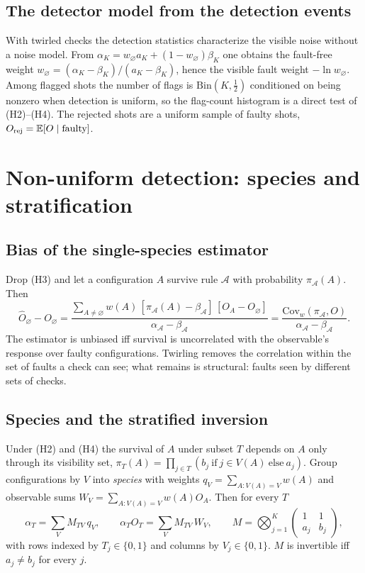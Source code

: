 \documentclass[11pt,a4paper]{article}
\theoremstyle{remark}
\newcommand{\Cov}{\mathrm{Cov}}
\newcommand{\Bin}{\mathrm{Bin}}
\newcommand{\acc}{\mathcal{A}}
\begin{document}
\subsection{The detector model from the detection events}

With twirled checks the detection statistics characterize the visible noise without a noise model. From $\alpha_K=w_\varnothing a_K+(1-w_\varnothing)\beta_K$ one obtains the fault-free weight $w_\varnothing=(\alpha_K-\beta_K)/(a_K-\beta_K)$, hence the visible fault weight $-\ln w_\varnothing$. Among flagged shots the number of flags is $\Bin(K,\tfrac12)$ conditioned on being nonzero when detection is uniform, so the flag-count histogram is a direct test of (H2)--(H4). The rejected shots are a uniform sample of faulty shots, $O_{\rm rej}=\mathbb E[O\mid\text{faulty}]$.

\section{Non-uniform detection: species and stratification}
\label{sec:species}

\subsection{Bias of the single-species estimator}

Drop (H3) and let a configuration $A$ survive rule $\acc$ with probability $\pi_\acc(A)$. Then
\begin{equation}
\hat O_\varnothing-O_\varnothing=\frac{\sum_{A\neq\varnothing}w(A)\,[\pi_\acc(A)-\beta_\acc]\,[O_A-O_\varnothing]}{\alpha_\acc-\beta_\acc}
=\frac{\Cov_w(\pi_\acc,O)}{\alpha_\acc-\beta_\acc}.
\label{eq:cov}
\end{equation}
The estimator is unbiased iff survival is uncorrelated with the observable's response over faulty configurations. Twirling removes the correlation within the set of faults a check can see; what remains is structural: faults seen by different sets of checks.

\subsection{Species and the stratified inversion}

Under (H2) and (H4) the survival of $A$ under subset $T$ depends on $A$ only through its visibility set,
$\pi_T(A)=\prod_{j\in T}(b_j\ \text{if}\ j\in V(A)\ \text{else}\ a_j)$. Group configurations by $V$ into \emph{species} with weights $q_V=\sum_{A:V(A)=V}w(A)$ and observable sums $W_V=\sum_{A:V(A)=V}w(A)O_A$. Then for every $T$
\begin{equation}
\alpha_T=\sum_V M_{TV}\,q_V,\qquad \alpha_TO_T=\sum_V M_{TV}\,W_V,\qquad
M=\bigotimes_{j=1}^K\begin{pmatrix}1&1\\ a_j&b_j\end{pmatrix},
\label{eq:species}
\end{equation}
with rows indexed by $T_j\in\{0,1\}$ and columns by $V_j\in\{0,1\}$. $M$ is invertible iff $a_j\neq b_j$ for every $j$.
\end{document}
